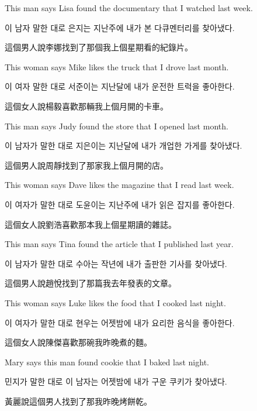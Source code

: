 \pex %
\a[label=E] This man says Lisa found the documentary that I watched last week.\par\nobreak
\a[label=K] \ko 이 남자 말한 대로 은지는 지난주에 내가 본 다큐멘터리를 찾아냈다\normalfont.\par\nobreak
\a[label=M] \zh 這個男人說李娜找到了那個我上個星期看的紀錄片。\normalfont
\xe

\pex %
\a[label=E] This woman says Mike likes the truck that I drove last month.\par\nobreak
\a[label=K] \ko 이 여자 말한 대로 서준이는 지난달에 내가 운전한 트럭을 좋아한다\normalfont.\par\nobreak
\a[label=M] \zh 這個女人說楊毅喜歡那輛我上個月開的卡車。\normalfont
\xe

\pex %
\a[label=E] This man says Judy found the store that I opened last month.\par\nobreak
\a[label=K] \ko 이 남자가 말한 대로 지은이는 지난달에 내가 개업한 가게를 찾아냈다\normalfont.\par\nobreak
\a[label=M] \zh 這個男人說周靜找到了那家我上個月開的店。\normalfont
\xe

\pex %
\a[label=E] This woman says Dave likes the magazine that I read last week.\par\nobreak
\a[label=K] \ko 이 여자가 말한 대로 도윤이는 지난주에 내가 읽은 잡지를 좋아한다\normalfont.\par\nobreak
\a[label=M] \zh 這個女人說劉浩喜歡那本我上個星期讀的雜誌。\normalfont
\xe

\pex %
\a[label=E] This man says Tina found the article that I published last year.\par\nobreak
\a[label=K] \ko 이 남자가 말한 대로 수아는 작년에 내가 출판한 기사를 찾아냈다\normalfont.\par\nobreak
\a[label=M] \zh 這個男人說趙悅找到了那篇我去年發表的文章。\normalfont
\xe

\pex %
\a[label=E] This woman says Luke likes the food that I cooked last night.\par\nobreak
\a[label=K] \ko 이 여자가 말한 대로 현우는 어젯밤에 내가 요리한 음식을 좋아한다\normalfont.\par\nobreak
\a[label=M] \zh 這個女人說陳傑喜歡那碗我昨晚煮的麵。\normalfont
\xe

\pex %
\a[label=E] \ljudge{*}Mary says this man found cookie that I baked last night.\par\nobreak
\a[label=K] \ljudge{*}\ko 민지가 말한 대로 이 남자는 어젯밤에 내가 구운 쿠키가 찾아냈다\normalfont.\par\nobreak
\a[label=M] \ljudge{*}\zh 黃麗說這個男人找到了那我昨晚烤餅乾。\normalfont
\xe

